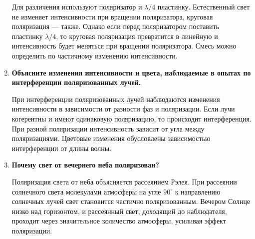 \begin{enumerate}
    Для различения используют поляризатор и $\lambda/4$ пластинку. Естественный свет не изменяет интенсивности при вращении поляризатора, круговая поляризация — также. Однако если перед поляризатором поставить пластинку $\lambda/4$, то круговая поляризация превратится в линейную и интенсивность будет меняться при вращении поляризатора. Смесь можно определить по частичному изменению интенсивности.

    \item \textbf{Объясните изменения интенсивности и цвета, наблюдаемые в опытах по интерференции поляризованных лучей.}

    При интерференции поляризованных лучей наблюдаются изменения интенсивности в зависимости от разности фаз и поляризации. Если лучи когерентны и имеют одинаковую поляризацию, то происходит интерференция. При разной поляризации интенсивность зависит от угла между поляризациями. Цветовые изменения обусловлены зависимостью интерференции от длины волны.

    \item \textbf{Почему свет от вечернего неба поляризован?}

    Поляризация света от неба объясняется рассеянием Рэлея. При рассеянии солнечного света молекулами атмосферы на угле $90^\circ$ к направлению солнечных лучей свет становится частично поляризованным. Вечером Солнце низко над горизонтом, и рассеянный свет, доходящий до наблюдателя, проходит через значительное количество атмосферы, усиливая эффект поляризации.

\end{enumerate}












